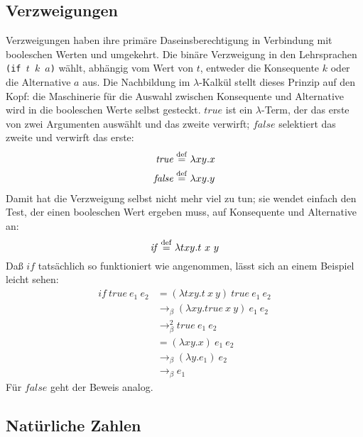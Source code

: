\subsection{Verzweigungen}
\label{sec:booleans}
%
Verzweigungen haben ihre primäre Daseinsberechtigung in Verbindung mit
booleschen Werten und umgekehrt.
Die binäre Verzweigung in den Lehrsprachen
\texttt{(if \(t\) \(k\) \(a\))}
wählt, abhängig vom Wert von $t$,
entweder die Konsequente $k$ oder die Alternative $a$ aus.  Die Nachbildung im
$\lambda$-Kalkül stellt dieses Prinzip auf den Kopf: die Maschinerie
für die Auswahl zwischen Konsequente und Alternative wird in die
booleschen Werte selbst gesteckt.  $\mathit{true}$ ist ein
$\lambda$-Term, der das erste von zwei Argumenten auswählt und das
zweite verwirft; $\mathit{false}$ selektiert das zweite und verwirft
das erste:
%
\begin{align*}
  \mathit{true} & \stackrel{\rm def}{=}{} \lambda x y.x \\
  \mathit{false} & \stackrel{\rm def}{=}{} \lambda x y.y
\end{align*}
%
Damit hat die Verzweigung selbst nicht mehr viel zu tun; sie wendet
einfach den Test, der einen booleschen Wert ergeben muss, auf
Konsequente und Alternative an:
%
\begin{displaymath}
  \mathit{if} \stackrel{\rm def}{=}{} \lambda t x y.t~x~y
\end{displaymath}
%
Daß $\mathit{if}$ tatsächlich so funktioniert wie angenommen, lässt
sich an einem Beispiel leicht sehen:
%
\begin{displaymath}
  \begin{split}
    \mathit{if}~\mathit{true}~e_1~e_2 & =
    (\lambda t x y.t~x~y)~\mathit{true}~e_1~e_2
    \\
    & \rightarrow_\beta (\lambda x y.\mathit{true}~x~y)~e_1~e_2\\
    & \rightarrow_\beta^2 \mathit{true}~e_1~e_2\\
    & = (\lambda x y.x)~e_1~e_2\\
    & \rightarrow_\beta (\lambda y.e_1)~e_2\\
    & \rightarrow_\beta e_1  \end{split}
\end{displaymath}
%
Für $\mathit{false}$ geht der Beweis analog.

\subsection{Natürliche Zahlen}

